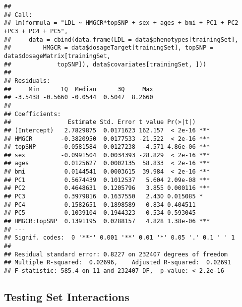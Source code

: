 \documentclass[]{article}
\newenvironment{Shaded}{\begin{snugshade}}{\end{snugshade}}
\newcommand{\KeywordTok}[1]{\textcolor[rgb]{0.13,0.29,0.53}{\textbf{#1}}}
\newcommand{\DataTypeTok}[1]{\textcolor[rgb]{0.13,0.29,0.53}{#1}}
\newcommand{\StringTok}[1]{\textcolor[rgb]{0.31,0.60,0.02}{#1}}
\newcommand{\CommentTok}[1]{\textcolor[rgb]{0.56,0.35,0.01}{\textit{#1}}}
\newcommand{\OperatorTok}[1]{\textcolor[rgb]{0.81,0.36,0.00}{\textbf{#1}}}
\newcommand{\NormalTok}[1]{#1}
\begin{document}
\begin{Shaded}
\end{Shaded}

\begin{verbatim}
## 
## Call:
## lm(formula = "LDL ~ HMGCR*topSNP + sex + ages + bmi + PC1 + PC2 +PC3 + PC4 + PC5", 
##     data = cbind(data.frame(LDL = data$phenotypes[trainingSet], 
##         HMGCR = data$dosageTarget[trainingSet], topSNP = data$dosageMatrix[trainingSet, 
##             topSNP]), data$covariates[trainingSet, ]))
## 
## Residuals:
##     Min      1Q  Median      3Q     Max 
## -3.5438 -0.5660 -0.0544  0.5047  8.2660 
## 
## Coefficients:
##                Estimate Std. Error t value Pr(>|t|)    
## (Intercept)   2.7829875  0.0171623 162.157  < 2e-16 ***
## HMGCR        -0.3820950  0.0177533 -21.522  < 2e-16 ***
## topSNP       -0.0581584  0.0127238  -4.571 4.86e-06 ***
## sex          -0.0991504  0.0034393 -28.829  < 2e-16 ***
## ages          0.0125627  0.0002135  58.833  < 2e-16 ***
## bmi           0.0144541  0.0003615  39.984  < 2e-16 ***
## PC1           0.5674439  0.1012537   5.604 2.09e-08 ***
## PC2           0.4648631  0.1205796   3.855 0.000116 ***
## PC3           0.3979816  0.1637550   2.430 0.015085 *  
## PC4           0.1582651  0.1898589   0.834 0.404511    
## PC5          -0.1039104  0.1944323  -0.534 0.593045    
## HMGCR:topSNP  0.1391195  0.0288157   4.828 1.38e-06 ***
## ---
## Signif. codes:  0 '***' 0.001 '**' 0.01 '*' 0.05 '.' 0.1 ' ' 1
## 
## Residual standard error: 0.8227 on 232407 degrees of freedom
## Multiple R-squared:  0.02696,    Adjusted R-squared:  0.02691 
## F-statistic: 585.4 on 11 and 232407 DF,  p-value: < 2.2e-16
\end{verbatim}

\subsection{Testing Set Interactions}\label{testing-set-interactions}
\end{document}
